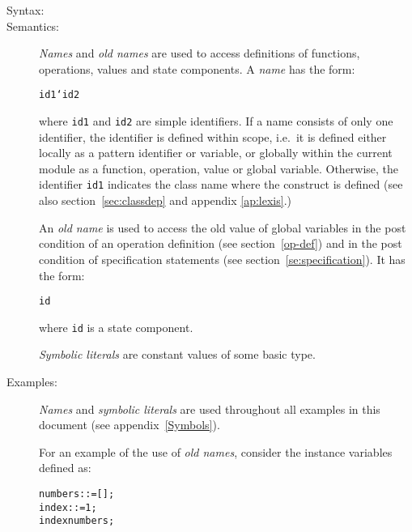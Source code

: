 \documentclass[\pformat,12pt]{article}
\begin{document}
\begin{description}
\item[Syntax:]




\item[Semantics:] {\it Names\/} and {\it old names\/} are used to access
  definitions of functions, operations, values and state components. A {\it
    name\/} has the form:
  \begin{alltt}
    id1`id2
  \end{alltt}
  where {\tt id1} and {\tt id2} are simple identifiers. If a name consists
  of only one identifier, the identifier is defined within scope, i.e.\ it
  is defined either locally as a pattern identifier or variable,
  or globally within the current module as a function, operation,
  value or global variable. 
  Otherwise, the identifier {\tt id1} indicates the
class name
where the
  construct is defined (see also
  section~\ref{sec:classdep}
and appendix \ref{ap:lexis}.)

  An {\it old name\/} is used to access the old value of global
  variables in the post condition of an operation definition (see
  section~\ref{op-def}) and in the post condition of specification
  statements (see section~\ref{se:specification}).  It has the form:

  \begin{alltt} 
    id~ 
  \end{alltt} 
  where {\tt id} is a state component.

  {\it Symbolic literals\/} are constant values of some basic type.

\item[Examples:] {\it Names} and {\it symbolic literals\/} are used
  throughout all examples in this document (see appendix~\ref{Symbols}).

  For an example of the use of {\it old names}, consider the instance 
  variables defined as:
  \begin{alltt}
      numbers:  := [];
      index  :  := 1;
     index  numbers;
  \end{alltt}


\end{description}
\end{document}
